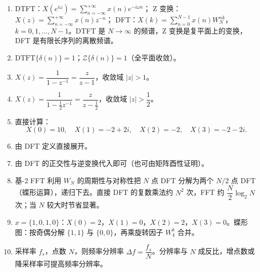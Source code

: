 \begin{enumerate}
\def\labelenumi{\arabic{enumi}.}
\item
  DTFT：\(X(e^{i\omega})=\sum_{n=-\infty}^{+\infty}x(n)e^{-i\omega n}\)；
  Z 变换：\(X(z)=\sum_{n=-\infty}^{+\infty}x(n)z^{-n}\)；
  DFT：\(X(k)=\sum_{n=0}^{N-1}x(n)W_N^{nk}\)，\(k=0,1,\ldots,N-1\)。DTFT
  是 \(N\to\infty\) 的频谱，Z 变换是复平面上的变换，DFT
  是有限长序列的离散频谱。
\item
  \(\mathrm{DTFT}\{\delta(n)\}=1\)；\(\mathcal Z\{\delta(n)\}=1\)（全平面收敛）。
\item
  \(X(z)=\dfrac{1}{1-z^{-1}}=\dfrac{z}{z-1}\)，收敛域 \(|z|>1\)。
\item
  \(X(z)=\dfrac{1}{1-\frac12 z^{-1}}=\dfrac{z}{z-\frac12}\)，收敛域
  \(|z|>\dfrac12\)。
\item
  直接计算： \[
  X(0)=10,\quad X(1)=-2+2i,\quad X(2)=-2,\quad X(3)=-2-2i .
  \]
\item
  由 DFT 定义直接展开。
\item
  由 DFT 的正交性与逆变换代入即可（也可由矩阵酉性证明）。
\item
  基-2 FFT 利用 \(W_N\) 的周期性与对称性把 \(N\) 点 DFT 分解为两个
  \(N/2\) 点 DFT（蝶形运算），递归下去。直接 DFT 的复数乘法约 \(N^2\)
  次，FFT 约 \(\dfrac{N}{2}\log_2 N\) 次；当 \(N\) 较大时节省显著。
\item
  \(x=\{1,0,1,0\}\)：\(X(0)=2\)，\(X(1)=0\)，\(X(2)=2\)，\(X(3)=0\)。蝶形图：按奇偶分解
  \(\{1,1\}\) 与 \(\{0,0\}\)，再乘旋转因子 \(W_4^k\) 合并。
\item
  采样率 \(f_s\)，点数 \(N\)，则频率分辨率
  \(\Delta f=\dfrac{f_s}{N}\)。分辨率与 \(N\)
  成反比，增点数或降采样率可提高频率分辨率。
\end{enumerate}

\backmatter
